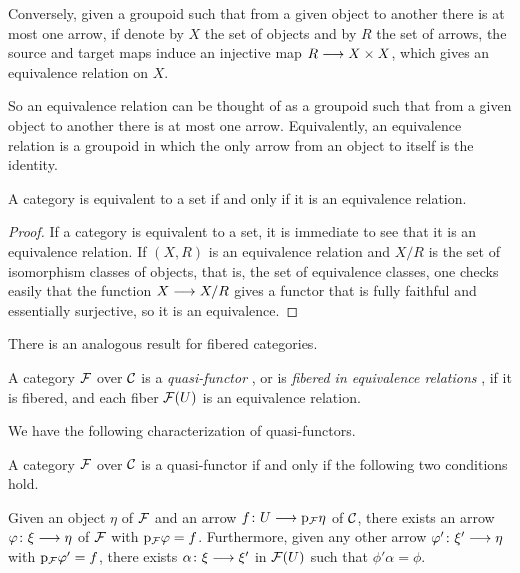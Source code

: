 \begin{3   FIBERED CATEGORIES}
\begin{3.5 Equivalences of fibered categories}
Conversely, given a groupoid such that from a given object to another there is at most one arrow, if denote by $X$ the set of objects and by $R$ the set of arrows, the source and target maps induce an injective map $R \arr X \times X$, which gives an equivalence relation on $X$.

So an equivalence relation can be thought of as a groupoid such that from a given object to another there is at most one arrow. Equivalently, an equivalence relation is a groupoid in which the only arrow from an object to itself is the identity.

\begin{proposition}\label{prop:equivalentset}
A category is equivalent to a set if and only if it is an equivalence relation.
\end{proposition}

\begin{proof}
If a category is equivalent to a set, it is immediate to see that it is an equivalence relation. If $(X, R)$  is an equivalence relation and $X/R$ is the set of isomorphism classes of objects, that is, the set of equivalence classes, one checks easily that the function $X \arr X/R$ gives a functor that is fully faithful and essentially surjective, so it is an equivalence.
\end{proof}


There is an analogous result for fibered categories.

\begin{definition} A category $\mathcal{F}$ over $\mathcal{C}$ is a \emph{quasi-functor}%
, or is \emph{fibered in equivalence relations}%
, if it is fibered, and each fiber $\mathcal{F}(U)$ is an equivalence relation.
\end{definition}

We have the following characterization of quasi-functors.

\begin{proposition}%
\label{prop:characterization-quasifunctors} A category $\mathcal{F}$ over $\mathcal{C}$ is a quasi-functor if and only if the following two conditions hold.

\begin{enumeratei}
\item Given an object $\eta$ of $\mathcal{F}$ and an arrow $f \colon U \arr \p_ \cF \eta$ of $\mathcal{C}$, there exists an arrow $\phi \colon \xi \arr \eta$ of $\mathcal{F}$ with $\mathrm{p}_{\mathcal{F}} \varphi = f$. Furthermore, given any other arrow $\phi'\colon \xi' \arr \eta$ with $\mathrm{p}_{\mathcal{F}}\varphi' = f$, there exists $\alpha\colon \xi \arr \xi'$ in $\mathcal{F}(U)$ such that $\phi'\alpha = \phi$.


\end{enumeratei}
\end{proposition}
\end{3.5 Equivalences of fibered categories}
\end{3   FIBERED CATEGORIES}
